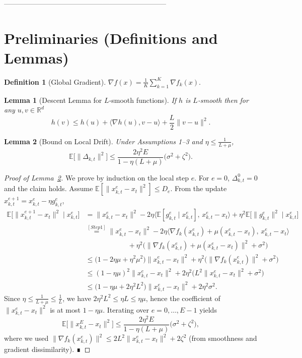\documentclass{article}
\newtheorem{lemma}{Lemma}
\newtheorem{definition}{Definition}
\newcommand{\EE}{\mathbb{E}}
\newcommand{\RR}{\mathbb{R}}
\begin{document}
---------------------------------------------------------------------

\section*{Preliminaries (Definitions and Lemmas)}
\begin{definition}[Global Gradient]
$\displaystyle \nabla f(x)=\frac{1}{K}\sum_{k=1}^{K}\nabla f_k(x).$
\end{definition}
\begin{lemma}[Descent Lemma for $L$‑smooth functions]\label{lem:descent}
If $h$ is $L$‑smooth then for any $u,v\in\RR^{d}$
\[
h(v)\le h(u)+\langle\nabla h(u),v-u\rangle+\frac{L}{2}\|v-u\|^{2}.
\]
\end{lemma}
\begin{lemma}[Bound on Local Drift]\label{lem:drift}
Under Assumptions 1–3 and $\eta\le\frac{1}{L+\mu}$,
\[
\EE\!\bigl[\|\Delta_{k,t}\|^{2}\bigr]\le
\frac{2\eta^{2}E}{1-\eta(L+\mu)}\bigl(\sigma^{2}+\zeta^{2}\bigr).
\]
\end{lemma}
\begin{proof}[Proof of Lemma~\ref{lem:drift}]
We prove by induction on the local step $e$.
For $e=0$, $\Delta_{k,t}^{0}=0$ and the claim holds.
Assume $\EE[\|x_{k,t}^{e}-x_t\|^{2}]\le D_{e}$.
From the update $x_{k,t}^{e+1}=x_{k,t}^{e}-\eta g_{k,t}^{e}$,
\[
\begin{aligned}
\EE\!\bigl[\|x_{k,t}^{e+1}-x_t\|^{2}\mid x_{k,t}^{e}\bigr]
&= \|x_{k,t}^{e}-x_t\|^{2}
   -2\eta\langle\EE[g_{k,t}^{e}\mid x_{k,t}^{e}],\,x_{k,t}^{e}-x_t\rangle
   +\eta^{2}\EE\!\bigl[\|g_{k,t}^{e}\|^{2}\mid x_{k,t}^{e}\bigr] \\
&\overset{[Step 1]}{=}
   \|x_{k,t}^{e}-x_t\|^{2}
   -2\eta\langle\nabla f_k(x_{k,t}^{e})+\mu(x_{k,t}^{e}-x_t),\,x_{k,t}^{e}-x_t\rangle \\
&\qquad\qquad\qquad
   +\eta^{2}\bigl(\|\nabla f_k(x_{k,t}^{e})+\mu(x_{k,t}^{e}-x_t)\|^{2}+\sigma^{2}\bigr)\\
&\le \bigl(1-2\eta\mu+\eta^{2}\mu^{2}\bigr)\|x_{k,t}^{e}-x_t\|^{2}
     +\eta^{2}\bigl(\|\nabla f_k(x_{k,t}^{e})\|^{2}+\sigma^{2}\bigr) \\
&\le (1-\eta\mu)^{2}\|x_{k,t}^{e}-x_t\|^{2}
     +2\eta^{2}\bigl(L^{2}\|x_{k,t}^{e}-x_t\|^{2}+\sigma^{2}\bigr) \\
&\le\bigl(1-\eta\mu+2\eta^{2}L^{2}\bigr)\|x_{k,t}^{e}-x_t\|^{2}+2\eta^{2}\sigma^{2}.
\end{aligned}
\]
Since $\eta\le\frac{1}{L+\mu}\le\frac{1}{L}$, we have $2\eta^{2}L^{2}\le\eta L\le\eta\mu$,
hence the coefficient of $\|x_{k,t}^{e}-x_t\|^{2}$ is at most $1-\eta\mu$.
Iterating over $e=0,\dots,E-1$ yields
\[
\EE\!\bigl[\|x_{k,t}^{E}-x_t\|^{2}\bigr]\le
\frac{2\eta^{2}E}{1-\eta(L+\mu)}\bigl(\sigma^{2}+\zeta^{2}\bigr),
\]
where we used $\|\nabla f_k(x_{k,t}^{e})\|^{2}\le 2L^{2}\|x_{k,t}^{e}-x_t\|^{2}+2\zeta^{2}$ (from smoothness and gradient dissimilarity). ∎
\end{proof}
\end{document}
